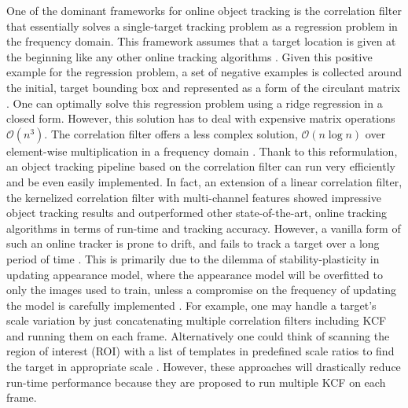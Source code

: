 \documentclass[10pt,twocolumn,letterpaper]{article}
\begin{document}
One of the dominant frameworks for online object tracking is the
correlation filter that essentially solves a single-target tracking
problem as a regression problem in the frequency domain. This
framework assumes that a target location is given at the beginning
like any other online tracking algorithms
\cite{smeulders2014survey}. Given this positive example for the
regression problem, a set of negative examples is collected around the
initial, target bounding box and represented as a form of the
circulant matrix \cite{henriques2015high}. One can optimally solve
this regression problem using a ridge regression in a closed
form. However, this solution has to deal with expensive matrix
operations $\mathcal{O}(n^{3})$. The correlation filter offers a less
complex solution, $\mathcal{O}(n\log n)$ over element-wise
multiplication in a frequency domain
\cite{bolme2010visual,henriques2015high}. Thank to this reformulation,
an object tracking pipeline based on the correlation filter can run
very efficiently and be even easily implemented. In fact, an extension
of a linear correlation filter, the kernelized correlation filter with
multi-channel features \cite{henriques2015high} showed impressive
object tracking results and outperformed other state-of-the-art,
online tracking algorithms in terms of run-time and tracking
accuracy. However, a vanilla form of such an online tracker is prone
to drift, and fails to track a target over a long period of time
\cite{henriques2015high}. This is primarily due to the dilemma of
stability-plasticity in updating appearance model, where the
appearance model will be overfitted to only the images used to train,
unless a compromise on the frequency of updating the model is
carefully implemented \cite{santner2010prost}. For example, one may
handle a target's scale variation by just concatenating multiple
correlation filters including KCF and running them on each
frame. Alternatively one could think of scanning the region of
interest (ROI) with a list of templates in predefined scale ratios to
find the target in appropriate scale
\cite{henriques2015high,tang2015multi,ma2015long,bibi2015multi,li2014scale}. However,
these approaches will drastically reduce run-time performance because
they are proposed to run multiple KCF on each frame.
\end{document}
